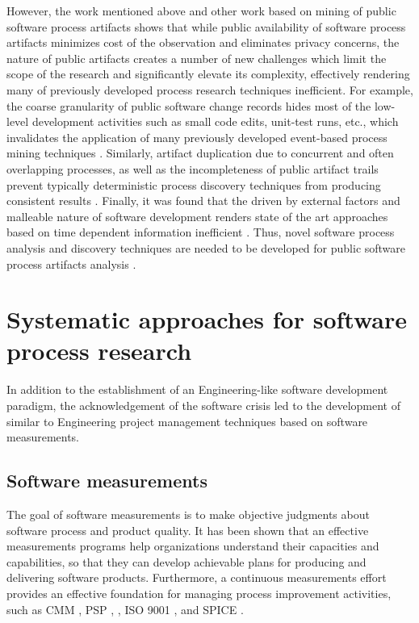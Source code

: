 However, the work mentioned above and other work based on mining of public software process artifacts shows 
that while public availability of software process artifacts minimizes cost of the observation and eliminates privacy concerns, 
the nature of public artifacts creates a number of new challenges which limit the scope of the research and 
significantly elevate its complexity, effectively rendering many of previously developed process research techniques inefficient. 
For example, the coarse granularity of public software change records hides most of the low-level development activities
such as small code edits, unit-test runs, etc., which invalidates the application of many previously developed event-based 
process mining techniques \cite{citeulike:10377366} \cite{citeulike:2678511}.
Similarly, artifact duplication due to concurrent and often overlapping processes, as well as the incompleteness of 
public artifact trails prevent typically deterministic process discovery techniques from producing consistent 
results \cite{citeulike:2678511} \cite{citeulike:7770568}. 
Finally, it was found that the driven by external factors and malleable nature of software development renders 
state of the art approaches based on time dependent information inefficient
 \cite{citeulike:10377345} \cite{citeulike:3378725}.
Thus, novel software process analysis and discovery techniques are needed to be 
developed for public software process artifacts analysis \cite{citeulike:7853299}.

%
%
\section{Systematic approaches for software process research}\label{section_software_trajectory}
In addition to the establishment of an Engineering-like software development paradigm, the acknowledgement of 
the software crisis led to the development of similar to Engineering project management techniques based on 
software measurements.

\subsection{Software measurements}
The goal of software measurements is to make objective judgments about software process and product quality. 
It has been shown that an effective measurements programs help organizations understand their capacities and 
capabilities, so that they can develop achievable plans for producing and delivering software products. 
Furthermore, a continuous measurements effort provides an effective foundation for managing process 
improvement activities, 
such as CMM \cite{citeulike:9962021}, 
PSP \cite{citeulike:8347315}, \cite{citeulike:5090131} \cite{citeulike:12929216}, 
ISO 9001 \cite{iso-standard}, and SPICE \cite{spice-standard}.

